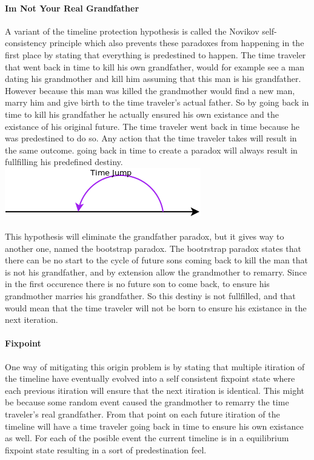 \paragraph{Im Not Your Real Grandfather}
A variant of the timeline protection hypothesis is called the Novikov self-consistency principle which also prevents these paradoxes from happening in the first place by stating that everything is predestined to happen. The time traveler that went back in time to kill his own grandfather, would for example see a man dating his grandmother and kill him assuming that this man is his grandfather. However because this man was killed the grandmother would find a new man, marry him and give birth to the time traveler's actual father. So by going back in time to kill his grandfather he actually ensured his own existance and the existance of his original future. The time traveler went back in time because he was predestined to do so. Any action that the time traveler takes will result in the same outcome. going back in time to create a paradox will always result in fullfilling his predefined destiny.
\\
\includegraphics[scale=0.5]{./images/fail.png}
\paragraph{}
This hypothesis will eliminate the grandfather paradox, but it gives way to another one, named the bootstrap paradox. The bootrstrap paradox states that there can be no start to the cycle of future sons coming back to kill the man that is not his grandfather, and by extension allow the grandmother to remarry. Since in the first occurence there is no future son to come back, to ensure his grandmother marries his grandfather. So this destiny is not fullfilled, and that would mean that the time traveler will not be born to ensure his existance in the next iteration.\\

\paragraph{Fixpoint}
One way of mitigating this origin problem is by stating that multiple itiration of the timeline have eventually evolved into a self consistent fixpoint state where each previous itiration will ensure that the next itiration is identical. This might be because some random event caused the grandmother to remarry the time traveler's real grandfather. From that point on each future itiration of the timeline will have a time traveler going back in time to ensure his own existance as well. For each of the posible event the current timeline is in a equilibrium fixpoint state resulting in a sort of predestination feel.

